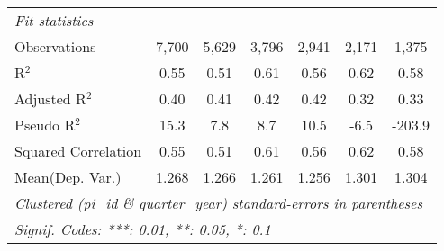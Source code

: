 \begin{tabular}{lcccccc}
   \midrule
   \emph{Fit statistics}\\
   Observations                                               & 7,700       & 5,629        & 3,796         & 2,941         & 2,171        & 1,375\\  
   R$^2$                                                      & 0.55        & 0.51         & 0.61          & 0.56          & 0.62         & 0.58\\  
   Adjusted R$^2$                                             & 0.40        & 0.41         & 0.42          & 0.42          & 0.32         & 0.33\\  
   Pseudo R$^2$                                               & 15.3        & 7.8          & 8.7           & 10.5          & -6.5         & -203.9\\  
   Squared Correlation                                        & 0.55        & 0.51         & 0.61          & 0.56          & 0.62         & 0.58\\  
Mean(Dep. Var.) & 1.268 & 1.266 & 1.261 & 1.256 & 1.301 & 1.304 \\
   \midrule \midrule
   \multicolumn{7}{l}{\emph{Clustered (pi\_id \& quarter\_year) standard-errors in parentheses}}\\
   \multicolumn{7}{l}{\emph{Signif. Codes: ***: 0.01, **: 0.05, *: 0.1}}\\
\end{tabular}
\par\endgroup
